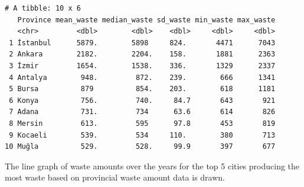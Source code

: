 \documentclass[
  11pt,
  a4paper,
  DIV=11,
  numbers=noendperiod]{scrartcl}
\begin{document}
\begin{verbatim}
# A tibble: 10 x 6
   Province mean_waste median_waste sd_waste min_waste max_waste
   <chr>         <dbl>        <dbl>    <dbl>     <dbl>     <dbl>
 1 İstanbul      5879.        5898     824.       4471      7043
 2 Ankara        2182.        2204.    158.       1881      2363
 3 İzmir         1654.        1538.    336.       1329      2337
 4 Antalya        948.         872.    239.        666      1341
 5 Bursa          879          854.    203.        618      1181
 6 Konya          756.         740.     84.7       643       921
 7 Adana          731.         734      63.6       614       826
 8 Mersin         613.         595      97.8       453       819
 9 Kocaeli        539.         534     110.        380       713
10 Muğla          529.         528.     99.9       397       677
\end{verbatim}

The line graph of waste amounts over the years for the top 5 cities
producing the most waste based on provincial waste amount data is drawn.
\end{document}
